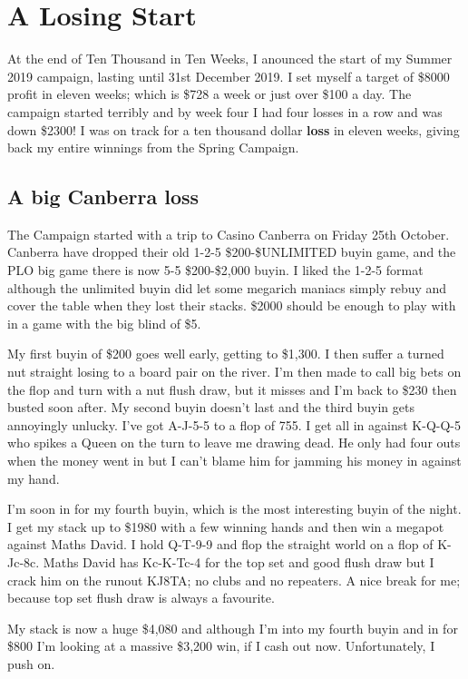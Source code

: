 \chapter{A Losing Start}

At the end of Ten Thousand in Ten Weeks, I anounced the start of my
Summer 2019 campaign, lasting until 31st December 2019. I set myself a
target of \$8000 profit in eleven weeks; which is \$728 a week or just
over \$100 a day. The campaign started terribly and by week four I had
four losses in a row and was down \$2300! I was on track for a ten
thousand dollar \textbf{loss} in eleven weeks, giving back my entire
winnings from the Spring Campaign.

\section*{A big Canberra loss}

The Campaign started with a trip to Casino Canberra on Friday 25th
October. Canberra have dropped their old 1-2-5 \$200-\$UNLIMITED buyin
game, and the PLO big game there is now 5-5 \$200-\$2,000 buyin. I
liked the 1-2-5 format although the unlimited buyin did let some
megarich maniacs simply rebuy and cover the table when they lost their
stacks. \$2000 should be enough to play with in a game with the big
blind of \$5.

My first buyin of \$200 goes well early, getting to \$1,300. I then
suffer a turned nut straight losing to a board pair on the river. I'm
then made to call big bets on the flop and turn with a nut flush draw,
but it misses and I'm back to \$230 then busted soon after. My second
buyin doesn't last and the third buyin gets annoyingly unlucky. I've
got A-J-5-5 to a flop of 755. I get all in against K-Q-Q-5 who spikes
a Queen on the turn to leave me drawing dead. He only had four outs
when the money went in but I can't blame him for jamming his money in
against my hand.

I'm soon in for my fourth buyin, which is the most interesting buyin
of the night. I get my stack up to \$1980 with a few winning hands and
then win a megapot against Maths David. I hold Q-T-9-9 and flop the
straight world on a flop of K-Jc-8c. Maths David has Kc-K-Tc-4 for the
top set and good flush draw but I crack him on the runout KJ8TA; no
clubs and no repeaters. A nice break for me; because top set flush
draw is always a favourite.

My stack is now a huge \$4,080 and although I'm into my fourth buyin
and in for \$800 I'm looking at a massive \$3,200 win, if I cash out
now. Unfortunately, I push on.

